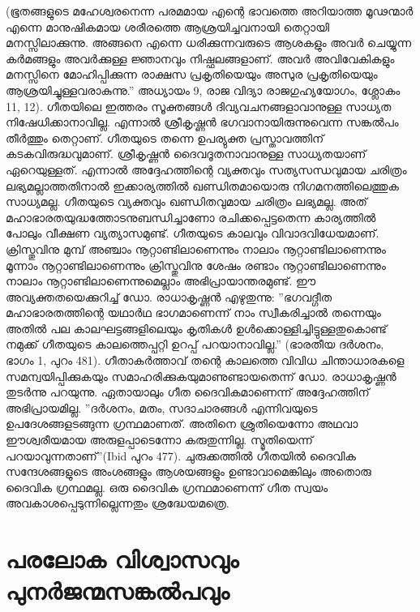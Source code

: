 (ഭൂതങ്ങളുടെ മഹേശ്വരനെന്ന പരമമായ എന്റെ ഭാവത്തെ അറിയാത്ത മൂഢന്മാര്‍ എന്നെ മാനുഷികമായ ശരീരത്തെ ആശ്രയിച്ചവനായി തെറ്റായി മനസ്സിലാക്കുന്നു. അങ്ങനെ എന്നെ ധരിക്കുന്നവരുടെ ആശകളും അവര്‍ ചെയ്യുന്ന കര്‍മങ്ങളും അവര്‍ക്കുള്ള ജ്ഞാനവും നിഷ്ഫലങ്ങളാണ്. അവര്‍ അവിവേകികളും മനസ്സിനെ മോഹിപ്പിക്കുന്ന രാക്ഷസ പ്രകൃതിയെയും അസുര പ്രകൃതിയെയും ആശ്രയിച്ചുള്ളവരാകുന്നു.'' അധ്യായം 9, രാജ വിദ്യാ രാജഗുഹ്യയോഗം, ശ്ലോകം 11, 12).
ഗീതയിലെ ഇത്തരം സൂക്തങ്ങള്‍ ദിവ്യവചനങ്ങളാവാനുള്ള സാധ്യത നിഷേധിക്കാനാവില്ല. എന്നാല്‍ ശ്രീകൃഷ്ണന്‍ ഭഗവാനായിരുന്നുവെന്ന സങ്കല്‍പം തീര്‍ത്തും തെറ്റാണ്. ഗീതയുടെ തന്നെ ഉപര്യുക്ത പ്രസ്താവത്തിന് കടകവിരുദ്ധവുമാണ്. ശ്രീകൃഷ്ണന്‍ ദൈവദൂതനാവാനുള്ള സാധ്യതയാണ് ഏറെയുള്ളത്. എന്നാല്‍ അദ്ദേഹത്തിന്റെ വ്യക്തവും സത്യസന്ധവുമായ ചരിത്രം ലഭ്യമല്ലാത്തതിനാല്‍ ഇക്കാര്യത്തില്‍ ഖണ്ഡിതമായൊരു നിഗമനത്തിലെത്തുക സാധ്യമല്ല.
ഗീതയുടെ വ്യക്തവും ഖണ്ഡിതവുമായ ചരിത്രം ലഭ്യമല്ല. അത് മഹാഭാരതയുദ്ധത്തോടനുബന്ധിച്ചാണോ രചിക്കപ്പെട്ടതെന്ന കാര്യത്തില്‍ പോലും വീക്ഷണ വ്യത്യാസമുണ്ട്. ഗീതയുടെ കാലവും വിവാദവിധേയമാണ്. ക്രിസ്തുവിനു മുമ്പ് അഞ്ചാം നൂറ്റാണ്ടിലാണെന്നും നാലാം നൂറ്റാണ്ടിലാണെന്നും മൂന്നാം നൂറ്റാണ്ടിലാണെന്നും ക്രിസ്തുവിനു ശേഷം രണ്ടാം നൂറ്റാണ്ടിലാണെന്നും നാലാം നൂറ്റാണ്ടിലാണെന്നുമെല്ലാം അഭിപ്രായാന്തരമുണ്ട്. ഈ അവ്യക്തതയെക്കുറിച്ച് ഡോ. രാധാകൃഷ്ണന്‍ എഴുതുന്നു: ''ഭഗവദ്ഗീത മഹാഭാരതത്തിന്റെ യഥാര്‍ഥ ഭാഗമാണെന്ന് നാം സ്വീകരിച്ചാല്‍ തന്നെയും അതില്‍ പല കാലഘട്ടങ്ങളിലെയും കൃതികള്‍ ഉള്‍ക്കൊള്ളിച്ചിട്ടുള്ളതുകൊണ്ട് നമുക്ക് ഗീതയുടെ കാലത്തെപ്പറ്റി ഉറപ്പ് പറയാനാവില്ല.'' (ഭാരതീയ ദര്‍ശനം, ഭാഗം 1, പുറം 481).
ഗീതാകര്‍ത്താവ് തന്റെ കാലത്തെ വിവിധ ചിന്താധാരകളെ സമന്വയിപ്പിക്കുകയും സമാഹരിക്കുകയുമാണുണ്ടായതെന്ന് ഡോ. രാധാകൃഷ്ണന്‍ തുടര്‍ന്നു പറയുന്നു.
ഏതായാലും ഗീത ദൈവികമാണെന്ന് അദ്ദേഹത്തിന് അഭിപ്രായമില്ല. ''ദര്‍ശനം, മതം, സദാചാരങ്ങള്‍ എന്നിവയുടെ ഉപദേശങ്ങളടങ്ങുന്ന ഗ്രന്ഥമാണത്. അതിനെ ശ്രുതിയെന്നോ അഥവാ ഈശ്വരീയമായ അരുളപ്പാടെന്നോ കരുതുന്നില്ല. സ്മൃതിയെന്ന് പറയാവുന്നതാണ്''(Ibid പുറം 477).
ചുരുക്കത്തില്‍ ഗീതയില്‍ ദൈവിക സന്ദേശങ്ങളുടെ അംശങ്ങളും ആശയങ്ങളും ഉണ്ടാവാമെങ്കിലും അതൊരു ദൈവിക ഗ്രന്ഥമല്ല. ഒരു ദൈവിക ഗ്രന്ഥമാണെന്ന് ഗീത സ്വയം അവകാശപ്പെടുന്നില്ലെന്നതും ശ്രദ്ധേയമത്രെ.
\chapter{പരലോക വിശ്വാസവും പുനര്‍ജന്മസങ്കല്‍പവും }
